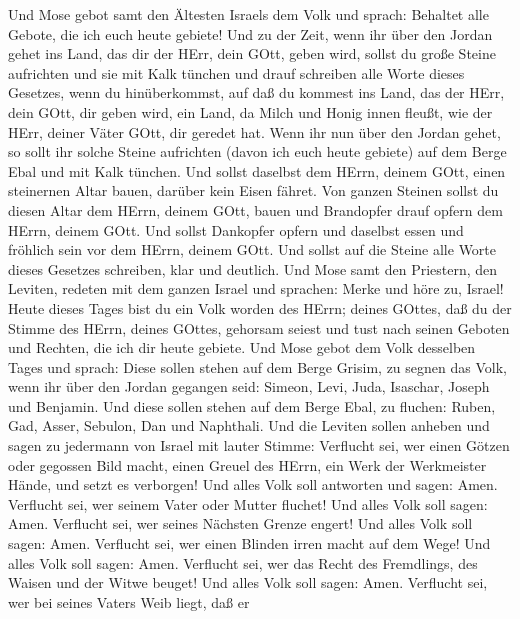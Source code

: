  Und Mose gebot samt den Ältesten Israels dem Volk und
sprach: Behaltet alle Gebote, die ich euch heute gebiete! 
Und zu der Zeit, wenn ihr über den Jordan gehet ins Land, das dir der
HErr, dein GOtt, geben wird, sollst du große Steine aufrichten und sie
mit Kalk tünchen  und drauf schreiben alle Worte dieses
Gesetzes, wenn du hinüberkommst, auf daß du kommest ins Land, das der
HErr, dein GOtt, dir geben wird, ein Land, da Milch und Honig innen
fleußt, wie der HErr, deiner Väter GOtt, dir geredet hat. 
Wenn ihr nun über den Jordan gehet, so sollt ihr solche Steine
aufrichten (davon ich euch heute gebiete) auf dem Berge Ebal und mit
Kalk tünchen.  Und sollst daselbst dem HErrn, deinem GOtt,
einen steinernen Altar bauen, darüber kein Eisen fähret. 
Von ganzen Steinen sollst du diesen Altar dem HErrn, deinem GOtt, bauen
und Brandopfer drauf opfern dem HErrn, deinem GOtt.  Und
sollst Dankopfer opfern und daselbst essen und fröhlich sein vor dem
HErrn, deinem GOtt.  Und sollst auf die Steine alle Worte
dieses Gesetzes schreiben, klar und deutlich.  Und Mose samt
den Priestern, den Leviten, redeten mit dem ganzen Israel und sprachen:
Merke und höre zu, Israel! Heute dieses Tages bist du ein Volk worden
des HErrn; deines GOttes,  daß du der Stimme des HErrn,
deines GOttes, gehorsam seiest und tust nach seinen Geboten und Rechten,
die ich dir heute gebiete.  Und Mose gebot dem Volk
desselben Tages und sprach:  Diese sollen stehen auf dem
Berge Grisim, zu segnen das Volk, wenn ihr über den Jordan gegangen
seid: Simeon, Levi, Juda, Isaschar, Joseph und Benjamin. 
Und diese sollen stehen auf dem Berge Ebal, zu fluchen: Ruben, Gad,
Asser, Sebulon, Dan und Naphthali.  Und die Leviten sollen
anheben und sagen zu jedermann von Israel mit lauter Stimme:
 Verflucht sei, wer einen Götzen oder gegossen Bild macht,
einen Greuel des HErrn, ein Werk der Werkmeister Hände, und setzt es
verborgen! Und alles Volk soll antworten und sagen: Amen. 
Verflucht sei, wer seinem Vater oder Mutter fluchet! Und alles Volk soll
sagen: Amen.  Verflucht sei, wer seines Nächsten Grenze
engert! Und alles Volk soll sagen: Amen.  Verflucht sei,
wer einen Blinden irren macht auf dem Wege! Und alles Volk soll sagen:
Amen.  Verflucht sei, wer das Recht des Fremdlings, des
Waisen und der Witwe beuget! Und alles Volk soll sagen: Amen.
 Verflucht sei, wer bei seines Vaters Weib liegt, daß er

